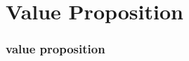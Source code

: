 \section{Value Proposition}
\begin{comment}
* Why make the connection?
** Legitimate Peripheral Participation & situated learning
*** Students can engage -- the currency is desire and energy
** Community of educators
*** Local (institutional)
*** Global (distributed)
*** A community of practice as opposed to a research community
\end{comment}

\begin{frame} 
\frametitle{value proposition}
\end{frame} 
